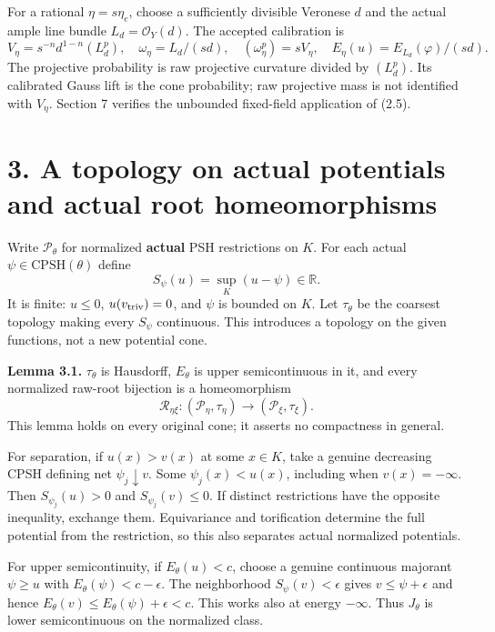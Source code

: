 \documentclass[
  10pt,
]{article}
\begin{document}
For a rational \(\eta=s\eta_e\), choose a sufficiently divisible
Veronese \(d\) and the actual ample line bundle \(L_d=\mathcal O_Y(d)\).
The accepted calibration is \[
V_\eta=s^{-n}d^{1-n}(L_d^p),\quad \omega_\eta=L_d/(sd),
\quad (\omega_\eta^p)=sV_\eta,\quad E_\eta(u)=E_{L_d}(\varphi)/(sd).       \tag{2.5}
\] The projective probability is raw projective curvature divided by
\((L_d^p)\). Its calibrated Gauss lift is the cone probability; raw
projective mass is not identified with \(V_\eta\). Section 7 verifies
the unbounded fixed-field application of (2.5).

\section{3. A topology on actual potentials and actual root
homeomorphisms}\label{a-topology-on-actual-potentials-and-actual-root-homeomorphisms}

Write \(\mathcal P_\theta\) for normalized \textbf{actual} PSH
restrictions on \(K\). For each actual \(\psi\in\mathrm{CPSH}(\theta)\)
define \[
S_\psi(u)=\sup_K(u-\psi)\in\mathbb R.
\] It is finite: \(u\le0\), \(u(v_{\rm triv})=0\), and \(\psi\) is
bounded on \(K\). Let \(\tau_\theta\) be the coarsest topology making
every \(S_\psi\) continuous. This introduces a topology on the given
functions, not a new potential cone.

\textbf{Lemma 3.1.} \(\tau_\theta\) is Hausdorff, \(E_\theta\) is upper
semicontinuous in it, and every normalized raw-root bijection is a
homeomorphism \[
\mathcal R_{\eta\xi}:(\mathcal P_\eta,\tau_\eta)\longrightarrow
                     (\mathcal P_\xi,\tau_\xi).                         \tag{3.1}
\] This lemma holds on every original cone; it asserts no compactness in
general.

For separation, if \(u(x)>v(x)\) at some \(x\in K\), take a genuine
decreasing CPSH defining net \(\psi_j\downarrow v\). Some
\(\psi_j(x)<u(x)\), including when \(v(x)=-\infty\). Then
\(S_{\psi_j}(u)>0\) and \(S_{\psi_j}(v)\le0\). If distinct restrictions
have the opposite inequality, exchange them. Equivariance and
torification determine the full potential from the restriction, so this
also separates actual normalized potentials.

For upper semicontinuity, if \(E_\theta(u)<c\), choose a genuine
continuous majorant \(\psi\ge u\) with \(E_\theta(\psi)<c-\epsilon\).
The neighborhood \(S_\psi(v)<\epsilon\) gives \(v\le\psi+\epsilon\) and
hence \(E_\theta(v)\le E_\theta(\psi)+\epsilon<c\). This works also at
energy \(-\infty\). Thus \(J_\theta\) is lower semicontinuous on the
normalized class.
\end{document}
